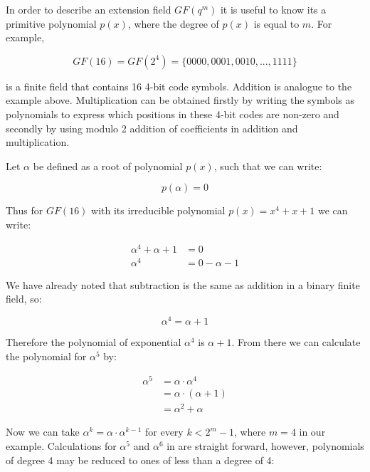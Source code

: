 \documentclass[../main.tex]{subfiles}
\begin{document}
    In order to describe an extension field $GF(q^m)$ it is useful to know its a primitive polynomial $p(x)$, where the degree of $p(x)$ is equal to $m$. For example,

    \begin{equation*}
         GF(16) = GF(2^4) = \{0000, 0001, 0010, ..., 1111\}
    \end{equation*}

    \noindent
    is a finite field that contains 16 4-bit code symbols. Addition is analogue to the example above. Multiplication can be obtained firstly by writing the symbols as polynomials to express which positions in these 4-bit codes are non-zero and secondly by using modulo 2 addition of coefficients in addition and multiplication.

    \noindent
    Let $\alpha$ be defined as a root of polynomial $p(x)$, such that we can write:

    \begin{equation*}
         p(\alpha) = 0
    \end{equation*}

    \noindent
    Thus for $GF(16)$ with its irreducible polynomial $p(x) = x^4 + x + 1$ we can write:

    \begin{align*}
        \alpha^4 + \alpha + 1 &= 0 \\
        \alpha^4 &= 0 - \alpha - 1
    \end{align*}

    \noindent
    We have already noted that subtraction is the same as addition in a binary finite field, so:

    \begin{equation*}
        \alpha^4 = \alpha + 1
    \end{equation*}

    \noindent
    Therefore the polynomial of exponential $\alpha^4$ is $\alpha + 1$. From there we can calculate the polynomial for $\alpha^5$ by:

    \begin{align*}
        \alpha^5 &= \alpha \cdot \alpha^4 \\
                 &= \alpha \cdot (\alpha + 1) \\
                 &= \alpha^2 + \alpha
    \end{align*}

    \noindent
    Now we can take $\alpha^k = \alpha \cdot \alpha^{k - 1}$ for every $k < 2^m - 1$, where $m = 4$ in our example. Calculations for $\alpha^5$ and $\alpha^6$ in  are straight forward, however, polynomials of degree 4 may be reduced to ones of less than a degree of 4:
\end{document}

